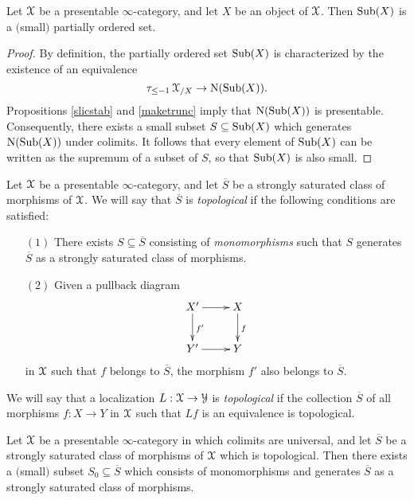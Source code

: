 \begin{proposition}\label{subobjset}
Let $\operatorname{\mathcal{X}}$ be a presentable $\infty$-category, and let $X$ be an object of $\operatorname{\mathcal{X}}$. Then
$\operatorname{Sub}(X)$ is a $($small$)$ partially ordered set.
\end{proposition}

\begin{proof}
By definition, the partially ordered set $\operatorname{Sub}(X)$ is characterized by the existence of
an equivalence 
$$ \tau_{ \leq -1} \operatorname{\mathcal{X}}_{/X} \rightarrow \operatorname{N}( \operatorname{Sub}(X)) .$$ 
Propositions \ref{slicstab} and \ref{maketrunc} imply that $\operatorname{N}(\operatorname{Sub}(X))$ is presentable.
Consequently, there exists a small subset $S \subseteq \operatorname{Sub}(X)$ which generates $\operatorname{N} (\operatorname{Sub}(X))$ under colimits. It follows that every element of $\operatorname{Sub}(X)$ can be written as the supremum of a subset of $S$, so that $\operatorname{Sub}(X)$ is also small.
\end{proof}

\begin{definition}\label{deftoploc}
Let $\operatorname{\mathcal{X}}$ be a presentable $\infty$-category, and let $\overline{S}$ be a strongly saturated class of morphisms of $\operatorname{\mathcal{X}}$. We will say that $\overline{S}$ is {\it topological} if the following conditions are satisfied:
\begin{itemize}
\item[$(1)$] There exists $S \subseteq \overline{S}$ consisting of {\em monomorphisms} such that
$S$ generates $\overline{S}$ as a strongly saturated class of morphisms.
\item[$(2)$] Given a pullback diagram
$$ \xymatrix{ X' \ar[r] \ar[d]^{f'} & X \ar[d]^{f} \\
Y' \ar[r] & Y }$$
in $\operatorname{\mathcal{X}}$ such that $f$ belongs to $\overline{S}$, the morphism $f'$ also belongs to $\overline{S}$.
\end{itemize}

We will say that a localization $L: \operatorname{\mathcal{X}} \rightarrow \operatorname{\mathcal{Y}}$ is {\it topological} if the collection $\overline{S}$ of all morphisms $f: X \rightarrow Y$ in $\operatorname{\mathcal{X}}$ such that $Lf$ is an equivalence
is topological.
\end{definition}

\begin{proposition}\label{toplocsmall}
Let $\operatorname{\mathcal{X}}$ be a presentable $\infty$-category in which colimits are universal, and let
$\overline{S}$ be a strongly saturated class of morphisms of $\operatorname{\mathcal{X}}$ which is topological.
Then there exists a $($small$)$ subset $S_0 \subseteq \overline{S}$ which consists of monomorphisms and generates $\overline{S}$ as a strongly saturated class of morphisms.
\end{proposition}

